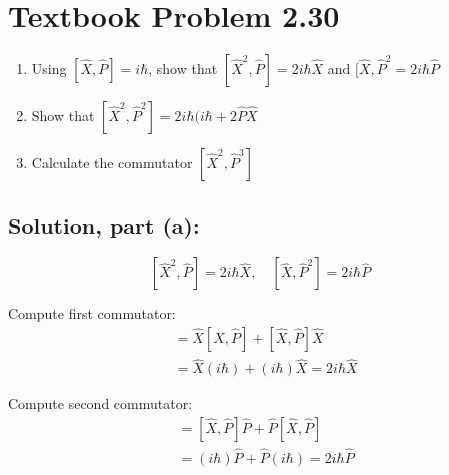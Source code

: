 \documentclass[12pt]{article}
\begin{document}
\section*{Textbook Problem 2.30}
    \begin{enumerate}
        \item [(a)] Using $[\hat{X}, \hat{P}] = i \hbar$, show that $[\hat{X}^2, \hat{P}] = 2i\hbar\hat{X}$ and $[\hat{X}, \hat{P}^2 = 2 i \hbar \hat{P}$
        \item [(b)] Show that $[\hat{X}^2, \hat{P}^2] = 2 i \hbar (i \hbar + 2 \hat{P} \hat{X}$
        \item [(c)] Calculate the commutator $[\hat{X}^2, \hat{P}^3]$
    \end{enumerate}

    \subsection*{Solution, part (a):}
        \[
        [\hat{X}^2, \hat{P}] = 2i\hbar\hat{X}, \quad [\hat{X}, \hat{P}^2] = 2i\hbar\hat{P}
        \]

        Compute first commutator:
        \begin{align*}
        [\hat{X}^2, \hat{P}] &= \hat{X}[\hat{X},\hat{P}] + [\hat{X},\hat{P}]\hat{X} \\
        &= \hat{X}(i\hbar) + (i\hbar)\hat{X} = 2i\hbar\hat{X}
        \end{align*}

        Compute second commutator:
        \begin{align*}
        [\hat{X}, \hat{P}^2] &= [\hat{X},\hat{P}]\hat{P} + \hat{P}[\hat{X},\hat{P}] \\
        &= (i\hbar)\hat{P} + \hat{P}(i\hbar) = 2i\hbar\hat{P}
        \end{align*}
\end{document}
